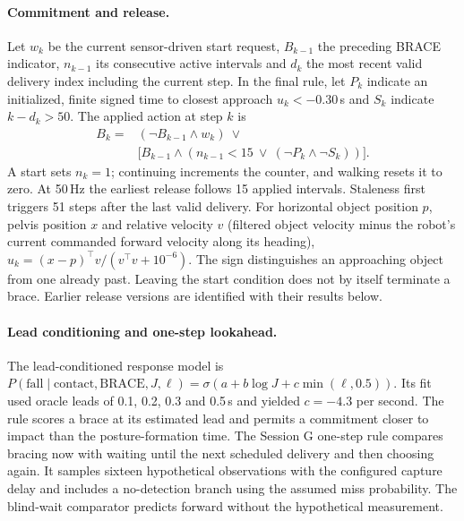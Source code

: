 \documentclass[10pt,twocolumn]{article}
\begin{document}
\paragraph{Commitment and release.} Let $w_k$ be the current sensor-driven start request, $B_{k-1}$ the preceding BRACE indicator, $n_{k-1}$ its consecutive active intervals and $d_k$ the most recent valid delivery index including the current step. In the final rule, let $P_k$ indicate an initialized, finite signed time to closest approach $u_k<-0.30$\,s and $S_k$ indicate $k-d_k>50$. The applied action at step $k$ is
\[
\begin{aligned}
 B_k={}&(\neg B_{k-1}\land w_k)\ \lor\\[-2pt]
       &\big[B_{k-1}\land (n_{k-1}<15\ \lor\ (\neg P_k\land\neg S_k))\big].
\end{aligned}
\]
A start sets $n_k=1$; continuing increments the counter, and walking resets it to zero. At 50\,Hz the earliest release follows 15 applied intervals. Staleness first triggers 51 steps after the last valid delivery. For horizontal object position $p$, pelvis position $x$ and relative velocity $v$ (filtered object velocity minus the robot's current commanded forward velocity along its heading), $u_k=(x-p)^\top v/(v^\top v+10^{-6})$. The sign distinguishes an approaching object from one already past. Leaving the start condition does not by itself terminate a brace. Earlier release versions are identified with their results below.

\paragraph{Lead conditioning and one-step lookahead.}\label{sec:voi}
The lead-conditioned response model is $P(\text{fall}\mid\text{contact},\text{BRACE},J,\ell)=\sigma(a+b\log J+c\min(\ell,0.5))$. Its fit used oracle leads of 0.1, 0.2, 0.3 and 0.5\,s and yielded $c=-4.3$ per second. The rule scores a brace at its estimated lead and permits a commitment closer to impact than the posture-formation time. The Session G one-step rule compares bracing now with waiting until the next scheduled delivery and then choosing again. It samples sixteen hypothetical observations with the configured capture delay and includes a no-detection branch using the assumed miss probability. The blind-wait comparator predicts forward without the hypothetical measurement.
\end{document}
